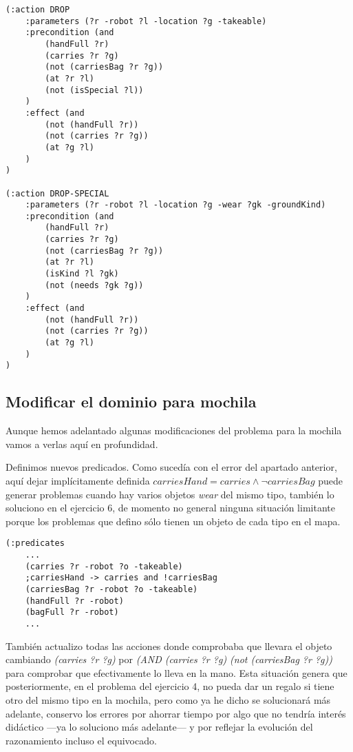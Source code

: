 \documentclass{article}
\begin{document}
\begin{lstlisting}
(:action DROP
    :parameters (?r -robot ?l -location ?g -takeable)
    :precondition (and 
        (handFull ?r)
        (carries ?r ?g)
        (not (carriesBag ?r ?g))
        (at ?r ?l)
        (not (isSpecial ?l))
    )
    :effect (and 
        (not (handFull ?r))
        (not (carries ?r ?g))
        (at ?g ?l)
    )
)

(:action DROP-SPECIAL
    :parameters (?r -robot ?l -location ?g -wear ?gk -groundKind)
    :precondition (and 
        (handFull ?r)
        (carries ?r ?g)
        (not (carriesBag ?r ?g))
        (at ?r ?l)
        (isKind ?l ?gk)
        (not (needs ?gk ?g))
    )
    :effect (and 
        (not (handFull ?r))
        (not (carries ?r ?g))
        (at ?g ?l)
    )
)
\end{lstlisting}

\subsection{Modificar el dominio para mochila}

Aunque hemos adelantado algunas modificaciones del problema para la mochila vamos a verlas aquí en profundidad.

Definimos nuevos predicados. Como sucedía con el error del apartado anterior, aquí dejar implícitamente definida $\mathit{carriesHand}=\mathit{carries}\land\lnot\mathit{carriesBag}$ puede generar problemas cuando hay varios objetos \emph{wear} del mismo tipo, también lo soluciono en el ejercicio 6, de momento no general ninguna situación limitante porque los problemas que defino sólo tienen un objeto de cada tipo en el mapa.

\begin{lstlisting}
(:predicates
    ...
    (carries ?r -robot ?o -takeable)
    ;carriesHand -> carries and !carriesBag
    (carriesBag ?r -robot ?o -takeable)
    (handFull ?r -robot)
    (bagFull ?r -robot)
    ...
\end{lstlisting}

También actualizo todas las acciones donde comprobaba que llevara el objeto cambiando \emph{(carries ?r ?g)} por \emph{(AND (carries ?r ?g) (not (carriesBag ?r ?g))} para comprobar que efectivamente lo lleva en la mano. Esta situación genera que posteriormente, en el problema del ejercicio 4, no pueda dar un regalo si tiene otro del mismo tipo en la mochila, pero como ya he dicho se solucionará más adelante, conservo los errores por ahorrar tiempo por algo que no tendría interés didáctico ---ya lo soluciono más adelante--- y por reflejar la evolución del razonamiento incluso el equivocado.
\end{document}
